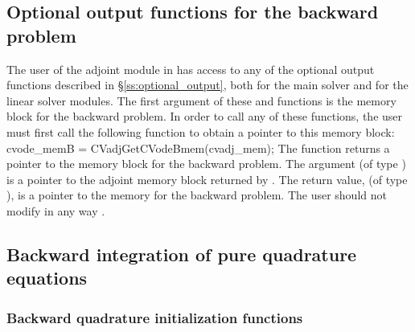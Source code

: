\subsection{Optional output functions for the backward problem}
\label{ss:optional_output_B}
The user of the adjoint module in {\cvodes} has access to any of the optional output 
functions described in \S\ref{ss:optional_output}, both for the main solver and for
the linear solver modules. The first argument of these  and 
functions is the {\cvodes} memory block for the backward problem. In order to call any of these
functions, the user must first call the following function to obtain a pointer to
this memory block:
{
  cvode\_memB = CVadjGetCVodeBmem(cvadj\_mem);
}
{
  The function  returns a pointer to the {\cvodes}
  memory block for the backward problem.
}
{
  The argument  (of type ) is a pointer to the
  adjoint memory block returned by .
}
{
  The return value,  (of type ), is a pointer to the
  {\cvodes} memory for the backward problem.
}
{
  {\warn}The user should not modify in any way .
}

\subsection{Backward integration of pure quadrature equations}


\subsubsection{Backward quadrature initialization functions}\label{sss:cvodequadmallocb}

